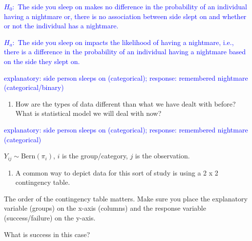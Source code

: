 \documentclass[
]{article}
\newenvironment{Shaded}{\begin{snugshade}}{\end{snugshade}}
\newcommand{\FunctionTok}[1]{\textcolor[rgb]{0.00,0.00,0.00}{#1}}
\newcommand{\NormalTok}[1]{#1}
\newcommand{\OtherTok}[1]{\textcolor[rgb]{0.56,0.35,0.01}{#1}}
\newcommand{\SpecialCharTok}[1]{\textcolor[rgb]{0.00,0.00,0.00}{#1}}
\providecommand{\tightlist}{%
  \setlength{\itemsep}{0pt}\setlength{\parskip}{0pt}}
\begin{document}
\textcolor{blue}{$H_0:$ The side you sleep on makes no difference in the probability of an individual having a nightmare or, there is no association between side slept on and whether or not the individual has a nightmare.}

\textcolor{blue}{$H_a:$ The side you sleep on impacts the likelihood of having a nightmare, i.e., there is a difference in the probability of an individual having a nightmare based on the side they slept on.}

\textcolor{blue}{explanatory: side person sleeps on (categorical); response: remembered nightmare (categorical/binary)}

\vspace{0.5in}

\begin{enumerate}
\def\labelenumi{(\arabic{enumi})}
\setcounter{enumi}{1}
\tightlist
\item
  How are the types of data different than what we have dealt with
  before? What is statistical model we will deal with now?
\end{enumerate}

\textcolor{blue}{explanatory: side person sleeps on (categorical); response: remembered nightmare (categorical)}

\(Y_{ij} \sim \mbox{Bern}(\pi_i)\), \(i\) is the group/category, \(j\)
is the observation.

\vspace{0.5in}

\begin{enumerate}
\def\labelenumi{(\arabic{enumi})}
\setcounter{enumi}{2}
\tightlist
\item
  A common way to depict data for this sort of study is using a 2 x 2
  contingency table.
\end{enumerate}

The order of the contingency table matters. Make sure you place the
explanatory variable (groups) on the x-axis (columns) and the response
variable (success/failure) on the y-axis.

What is success in this case?

\begin{Shaded}
\end{Shaded}
\end{document}
